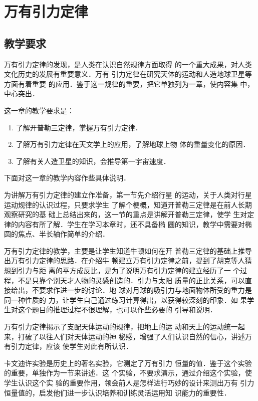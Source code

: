 \chapter{万有引力定律}\minitoc[n]
\section{教学要求}
万有引力定律的发现，是人类在认识自然规律方面取得
的一个重大成果，对人类文化历史的发展有重要意义．万有
引力定律在研究天体的运动和人造地球卫星等方面有着重要
的应用．鉴于这一规律的重要，把它单独列为一章，使内容集
中，中心突出．

这一章的教学要求是：
\begin{enumerate}
\item 了解开普勒三定律，掌握万有引力定律．
\item 了解万有引力定律在天文学上的应用，了解地球上物
体的重量变化的原因．
\item 了解有关人造卫星的知识，会推导第一宇宙速度．
\end{enumerate}

下面对这一章的教学内容作些具体说明．

为讲解万有引力定律的建立作准备，第一节先介绍行星
的运动，关于人类对行星运动规律的认识过程，只要求学生
了解个梗概，知道开普勒三定律是在前人长期观察研究的基
础上总结出来的，这一节的重点是讲解开普勒三定律，使学
生对定律的内容有所了解．学生在学习本章时，还不具备椭
圆的知识，教学中需要对椭圆的焦点、半长轴作简单的介绍．

万有引力定律的教学，主要是让学生知道牛顿如何在开
普勒三定律的基础上推导出万有引力定律的思路．在介绍牛
顿建立万有引力定律之前，提到了胡克等人猜想到引力与距
离的平方成反比，是为了说明万有引力定律的建立经历了一
个过程，不是只靠个别天才人物的灵感创造的．引力与太阳
质量的正比关系，可以直接给出，不要求作进一步的讨论．地
球对月球的吸引力与地面物体所受的重力是同一种性质的
力，让学生自己通过练习计算得出，以获得较深刻的印象．如
果学生对这个题目的推理过程不很理解，也可以作些必要的
引导和说明．

万有引力定律揭示了支配天体运动的规律，把地上的运
动和天上的运动统一起来，打破了以往人们对天体运动的神
秘感，增强了人们认识自然的信心，讲述万有引力定律，应该
使学生对此有所认识．

卡文迪许实验是历史上的著名实验，它测定了万有引力
恒量的值．鉴于这个实验的重要，单独作为一节来讲述．这
个实验，不要求演示，通过介绍这个实验，使学生认识这个实
验的重要作用，领会前人是怎样进行巧妙的设计来测出万有
引力恒量值的，启发他们进一步认识培养和训练灵活运用知
识能力的重要性．

